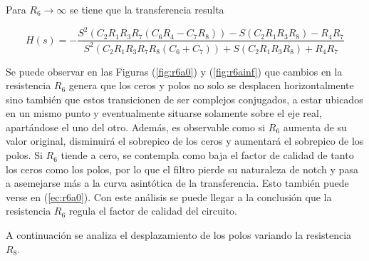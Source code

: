Para $R_6 \rightarrow \infty$ se tiene que la transferencia resulta

\begin{equation}
H(s)=-\frac{S^2 (C_2 R_1 R_3 R_7 (C_6 R_4 - C_7 R_8)) - S (C_2 R_1 R_3 R_8) - R_4 R_7}{S^2 (C_2 R_1 R_3 R_7 R_8 (C_6 + C_7) ) + S (C_2 R_1 R_3 R_8) + R_4 R_7}
\end{equation}

Se puede observar en las Figuras (\ref{fig:r6a0}) y (\ref{fig:r6ainf}) que cambios en la resistencia $R_6$ genera que los ceros y polos no solo se desplacen horizontalmente sino también que estos transicionen de ser complejos conjugados, a estar ubicados en un mismo punto y eventualmente situarse solamente sobre el eje real, apartándose el uno del otro. Además, es observable como si $R_6$ aumenta de su valor original, disminuirá el sobrepico de los ceros y aumentará el sobrepico de los polos. Si $R_6$ tiende a cero, se contempla como baja el factor de calidad de tanto los ceros como los polos, por lo que el filtro pierde su naturaleza de notch y pasa a asemejarse más a la curva asintótica de la transferencia. Esto también puede verse en (\ref{ec:r6a0}). Con este análisis se puede llegar a la conclusión que la resistencia $R_6$ regula el factor de calidad del circuito.


A continuación se analiza el desplazamiento de los polos variando la resistencia $R_8$. 

